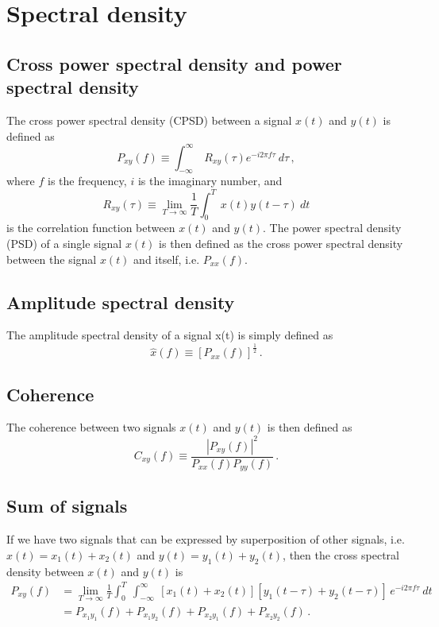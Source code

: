\section{Spectral density \label{appendix:spectral_density}}

\subsection{Cross power spectral density and power spectral density}
The cross power spectral density (CPSD) between a signal $x(t)$ and $y(t)$ is defined as
\begin{equation}
	P_{xy}(f) \equiv \int_{-\infty}^\infty\ R_{xy}(\tau) e^{-i2\pi f \tau}\ d\tau\,,
\end{equation}
where $f$ is the frequency, $i$ is the imaginary number, and
\begin{equation}
	R_{xy}(\tau) \equiv \lim_{T\to\infty}\frac{1}{T}\int_0^T\ x(t)y(t-\tau)\ dt
\end{equation}
is the correlation function between $x(t)$ and $y(t)$.
The power spectral density (PSD) of a single signal $x(t)$ is then defined as the cross power spectral density between the signal $x(t)$ and itself, i.e. $P_{xx}(f)$.

\subsection{Amplitude spectral density}
The amplitude spectral density of a signal x(t) is simply defined as
\begin{equation}
	\hat{x}(f) \equiv \left[P_{xx}(f)\right]^{\frac{1}{2}}\,.
\end{equation}

\subsection{Coherence}
The coherence between two signals $x(t)$ and $y(t)$ is then defined as
\begin{equation}
	C_{xy}(f) \equiv \frac{\left\lvert P_{xy}(f)\right\rvert^2}{P_{xx}(f)P_{yy}(f)}\,.
\end{equation}

\subsection{Sum of signals}
If we have two signals that can be expressed by superposition of other signals, i.e. $x(t)=x_1(t)+x_2(t)$ and $y(t)=y_1(t)+y_2(t)$, then the cross spectral density between $x(t)$ and $y(t)$ is
\begin{equation}
	\begin{split}
		P_{xy}(f) &= \lim_{T\to\infty}\frac{1}{T}\int_0^T\ \int_{-\infty}^\infty\  \left[x_1(t)+x_2(t)\right][y_1(t-\tau)+y_2(t-\tau)]\,e^{-i2\pi f\tau}\ dt \\
		&= P_{x_1y_1}(f) + P_{x_1y_2}(f) + P_{x_2y_1}(f) + P_{x_2y_2}(f)\,.
	\end{split} 
\end{equation}
